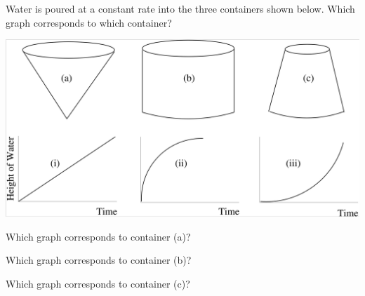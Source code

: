 \documentclass{ximera}
\author{Vic Ferdinand, Betsy McNeal, Jenny Sheldon}
\begin{document}
\licenseAPC
\begin{exercise}
Water is poured at a constant rate into the three containers shown
below. Which graph corresponds to which container?


\begin{image}
\includegraphics[width=\textwidth]{GraphicDetails2.png}
\end{image}

Which graph corresponds to container (a)?
\begin{multipleChoice}
\end{multipleChoice}


Which graph corresponds to container (b)?
\begin{multipleChoice}
\end{multipleChoice}


Which graph corresponds to container (c)?
\begin{multipleChoice}
\end{multipleChoice}

\end{exercise}
\end{document}
